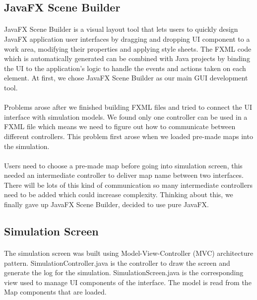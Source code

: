 \documentclass[a4paper,11pt,titlepage]{article}
\begin{document}
\subsection{JavaFX Scene Builder}
\paragraph{}
JavaFX Scene Builder is a visual layout tool that lets users to quickly design JavaFX application user interfaces by dragging and dropping UI component to a work area, modifying their properties and applying style sheets. The FXML code which is automatically generated can be combined with Java projects by binding the UI to the application's logic to handle the events and actions taken on each element. At first, we chose JavaFX Scene Builder as our main GUI development tool.
\paragraph{}
Problems arose after we finished building FXML files and tried to connect the UI interface with simulation models. We found only one controller can be used in a FXML file which means we need to figure out how to communicate between different controllers. This problem first arose when we loaded pre-made maps into the simulation. 
\paragraph{}
Users need to choose a pre-made map before going into simulation screen, this needed an intermediate controller to deliver map name between two interfaces. There will be lots of this kind of communication so many intermediate controllers need to be added which could increase complexity. Thinking about this, we finally gave up JavaFX Scene Builder, decided to use pure JavaFX.

\subsection{Simulation Screen}
\paragraph{}
The simulation screen was built using Model-View-Controller (MVC) architecture pattern. SimulationController.java is the controller to draw the screen and generate the log for the simulation. SimulationScreen.java is the corresponding view used to manage UI components of the interface. The model is read from the Map components that are loaded.
\end{document}
